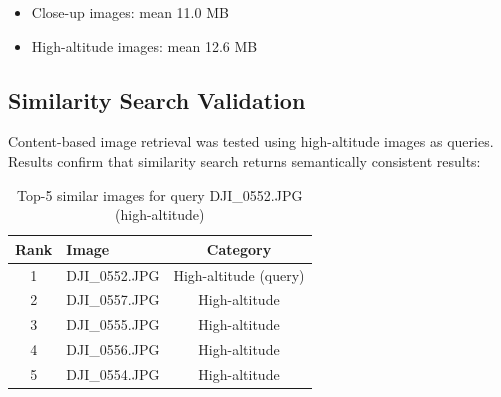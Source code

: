 \begin{itemize}
    \item Close-up images: mean 11.0 MB
    \item High-altitude images: mean 12.6 MB
\end{itemize}

\subsection{Similarity Search Validation}

Content-based image retrieval was tested using high-altitude images as queries. Results confirm that similarity search returns semantically consistent results:

\begin{table}[H]
\centering
\caption{Top-5 similar images for query DJI\_0552.JPG (high-altitude)}
\label{tab:similarity}
\begin{tabular}{clc}
\toprule
\textbf{Rank} & \textbf{Image} & \textbf{Category} \\
\midrule
1 & DJI\_0552.JPG & High-altitude (query) \\
2 & DJI\_0557.JPG & High-altitude \\
3 & DJI\_0555.JPG & High-altitude \\
4 & DJI\_0556.JPG & High-altitude \\
5 & DJI\_0554.JPG & High-altitude \\
\bottomrule
\end{tabular}
\end{table}

